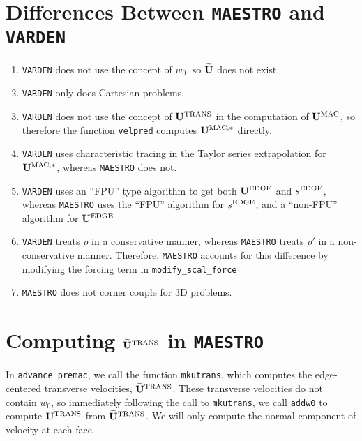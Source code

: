 \section{Differences Between {\tt MAESTRO} and {\tt VARDEN}}
\begin{enumerate}
\item {\tt VARDEN} does not use the concept of $w_0$, so $\widetilde{{\bf U}}$ does
  not exist.
\item {\tt VARDEN} only does Cartesian problems.
\item {\tt VARDEN} does not use the concept of ${\bf U}^{\rm TRANS}$ in the
  computation of ${\bf U}^{\rm MAC}$, so therefore the function {\tt velpred}
  computes ${\bf U}^{\rm MAC,*}$ directly.
\item {\tt VARDEN} uses characteristic tracing in the Taylor series
  extrapolation for ${\bf U}^{\rm MAC,*}$, whereas {\tt MAESTRO} does not.
\item {\tt VARDEN} uses an ``FPU'' type algorithm to get both
  ${\bf U}^{\rm EDGE}$ and $s^{\rm EDGE}$, whereas {\tt MAESTRO} uses the
  ``FPU'' algorithm for $s^{\rm EDGE}$, and a ``non-FPU'' algorithm for
  ${\bf U}^{\rm EDGE}$
\item {\tt VARDEN} treats $\rho$ in a conservative manner, whereas
  {\tt MAESTRO} treats $\rho'$ in a non-conservative manner.
  Therefore, {\tt MAESTRO} accounts for this difference by modifying
  the forcing term in {\tt modify\_scal\_force}
\item {\tt MAESTRO} does not corner couple for 3D problems.
\end{enumerate}

\cleardoublepage

\section{Computing $\widetilde{{\bf U}}^{\rm TRANS}$ in {\tt MAESTRO}}
In {\tt advance\_premac}, we call the function {\tt mkutrans}, which
computes the edge-centered transverse velocities, $\widetilde{{\bf U}}^{\rm TRANS}$.
These transverse velocities do not contain $w_0$, so immediately
following the call to {\tt mkutrans}, we call {\tt addw0} to compute
${\bf U}^{\rm TRANS}$ from $\widetilde{{\bf U}}^{\rm TRANS}$.  We will only compute the normal
component of velocity at each face.\\

